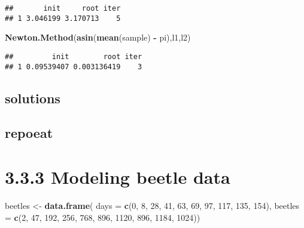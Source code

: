 \documentclass[]{article}
\newenvironment{Shaded}{\begin{snugshade}}{\end{snugshade}}
\newcommand{\DataTypeTok}[1]{\textcolor[rgb]{0.13,0.29,0.53}{#1}}
\newcommand{\DecValTok}[1]{\textcolor[rgb]{0.00,0.00,0.81}{#1}}
\newcommand{\KeywordTok}[1]{\textcolor[rgb]{0.13,0.29,0.53}{\textbf{#1}}}
\newcommand{\NormalTok}[1]{#1}
\newcommand{\OperatorTok}[1]{\textcolor[rgb]{0.81,0.36,0.00}{\textbf{#1}}}
\newcommand{\StringTok}[1]{\textcolor[rgb]{0.31,0.60,0.02}{#1}}
\begin{document}
\begin{verbatim}
##       init     root iter
## 1 3.046199 3.170713    5
\end{verbatim}

\begin{Shaded}
\begin{Highlighting}[]
\KeywordTok{Newton.Method}\NormalTok{(}\KeywordTok{asin}\NormalTok{(}\KeywordTok{mean}\NormalTok{(sample) }\OperatorTok{-}\StringTok{ }\NormalTok{pi),l1,l2)}
\end{Highlighting}
\end{Shaded}

\begin{verbatim}
##         init        root iter
## 1 0.09539407 0.003136419    3
\end{verbatim}

\hypertarget{solutions}{%
\subsection{solutions}\label{solutions}}

\hypertarget{repoeat}{%
\subsection{repoeat}\label{repoeat}}

\hypertarget{modeling-beetle-data}{%
\section{3.3.3 Modeling beetle data}\label{modeling-beetle-data}}

\begin{Shaded}
\begin{Highlighting}[]
\NormalTok{beetles <-}\StringTok{ }\KeywordTok{data.frame}\NormalTok{(}
    \DataTypeTok{days    =} \KeywordTok{c}\NormalTok{(}\DecValTok{0}\NormalTok{,  }\DecValTok{8}\NormalTok{,  }\DecValTok{28}\NormalTok{,  }\DecValTok{41}\NormalTok{,  }\DecValTok{63}\NormalTok{,  }\DecValTok{69}\NormalTok{,   }\DecValTok{97}\NormalTok{, }\DecValTok{117}\NormalTok{,  }\DecValTok{135}\NormalTok{,  }\DecValTok{154}\NormalTok{),}
    \DataTypeTok{beetles =} \KeywordTok{c}\NormalTok{(}\DecValTok{2}\NormalTok{, }\DecValTok{47}\NormalTok{, }\DecValTok{192}\NormalTok{, }\DecValTok{256}\NormalTok{, }\DecValTok{768}\NormalTok{, }\DecValTok{896}\NormalTok{, }\DecValTok{1120}\NormalTok{, }\DecValTok{896}\NormalTok{, }\DecValTok{1184}\NormalTok{, }\DecValTok{1024}\NormalTok{))}
\end{Highlighting}
\end{Shaded}
\end{document}
